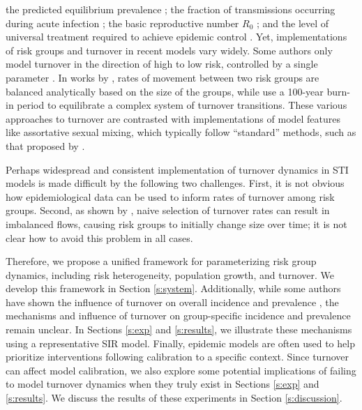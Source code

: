 the predicted equilibrium prevalence \citep{Stigum1994,Eaton2014};
the fraction of transmissions occurring during acute infection \citep{Zhang2012};
the basic reproductive number $R_0$ \citep{Henry2015}; and
the level of universal treatment required to achieve epidemic control \citep{Henry2015}.
Yet, implementations of risk groups and turnover in recent models vary widely.
Some authors only model turnover in the direction of high to low risk,
controlled by a single parameter \citep{Stigum1994,Eaton2014}.
In works by \citeauthor{Koopman1997},
rates of movement between two risk groups
are balanced analytically based on the size of the groups,
while \citet{Boily2015} use a 100-year burn-in period
to equilibrate a complex system of turnover transitions.
These various approaches to turnover are contrasted with
implementations of model features like assortative sexual mixing,
which typically follow ``standard'' methods,
such as that proposed by \citet{Nold1980}.
\par
Perhaps widespread and consistent implementation of turnover dynamics in STI models
is made difficult by the following two challenges.
First, it is not obvious how epidemiological data can be used to
inform rates of turnover among risk groups.
Second, as shown by \citet{Boily2015},
naive selection of turnover rates can result in imbalanced flows,
causing risk groups to initially change size over time;
it is not clear how to avoid this problem in all cases.
\par
Therefore, we propose a unified framework for
parameterizing risk group dynamics,
including risk heterogeneity, population growth, and turnover.
We develop this framework in Section \ref{s:system}.
Additionally, while some authors have shown the influence
of turnover on overall incidence and prevalence
\citep{Stigum1994,Zhang2012,Henry2015},
the mechanisms and influence of turnover on
group-specific incidence and prevalence remain unclear.
In Sections \ref{s:exp} and \ref{s:results},
we illustrate these mechanisms using a representative SIR model.
Finally, epidemic models are often used to help prioritize interventions
following calibration to a specific context.
Since turnover can affect model calibration,
we also explore some potential implications of failing to model turnover dynamics
when they truly exist in Sections \ref{s:exp} and \ref{s:results}.
We discuss the results of these experiments in Section \ref{s:discussion}.